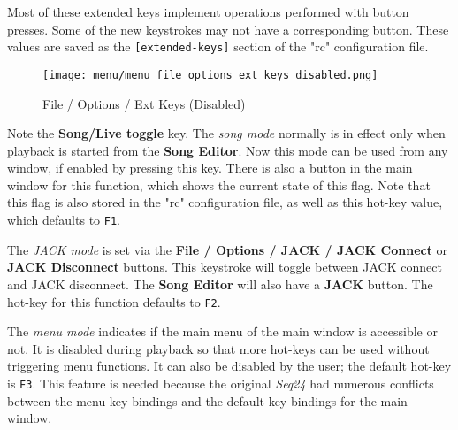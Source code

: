    Most of these extended keys implement operations performed with button
   presses.  Some of the new keystrokes may not have a corresponding
   button.
   These values are saved as the \texttt{[extended-keys]} section of the "rc"
   configuration file.

\begin{figure}[H]
   \centering 
   \texttt{[image: menu/menu\_file\_options\_ext\_keys\_disabled.png]}
   \caption{File / Options / Ext Keys (Disabled)}
   \label{fig:seq64_menu_file_options_ext_keys_disabled}
\end{figure}

   Note the \textbf{Song/Live toggle} key.
   The \textsl{song mode} normally is in effect only when playback is started
   from the \textbf{Song Editor}.  Now this mode can be used from any
   window, if enabled by pressing this key.  There is also
   a button in the main window for this function, which shows the current state
   of this flag.  Note that this flag is also stored in the "rc" configuration
   file, as well as this hot-key value, which defaults to \texttt{F1}.

   The \textsl{JACK mode} is set via the
   \textbf{File / Options / JACK / JACK Connect} or 
   \textbf{JACK Disconnect} buttons.
   This keystroke will toggle between JACK connect and JACK disconnect.
   The \textbf{Song Editor} will also have a \textbf{JACK} button.
   The hot-key for this function defaults to \texttt{F2}.

   The \textsl{menu mode} indicates if the main menu of the
   main window is accessible or not.  It is disabled during playback
   so that more hot-keys can be used without triggering menu functions.
   It can also be disabled by the user; the default hot-key is \texttt{F3}.
   This feature is needed because the original \textsl{Seq24} had numerous
   conflicts between the menu key bindings and the default key bindings for the
   main window.

